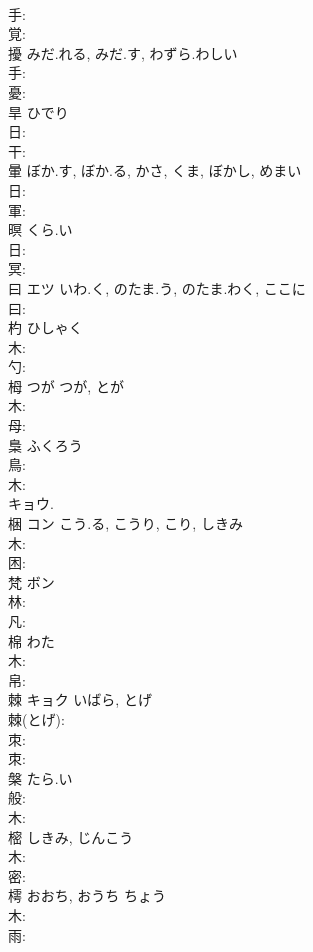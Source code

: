 \documentclass[8pt]{extreport}
\begin{document}
\begin{CJK}{UTF8}{min}
\\	手: 
\\	覚: 
\\	擾		みだ.れる, みだ.す, わずら.わしい				
\\	手: 
\\	憂: 
\\	旱		ひでり				
\\	日: 
\\	干: 
\\	暈		ぼか.す, ぼか.る, かさ, くま, ぼかし, めまい				
\\	日: 
\\	軍: 
\\	暝		くら.い				
\\	日: 
\\	冥: 
\\	曰	エツ	いわ.く, のたま.う, のたま.わく, ここに		
\\	曰: 
\\	杓		ひしゃく				
\\	木: 
\\	勺: 
\\	栂	つが	つが, とが		
\\	木: 
\\	母: 
\\	梟		ふくろう				
\\	鳥: 
\\	木: 
\\	キョウ.
\\	梱	コン	こう.る, こうり, こり, しきみ		
\\	木: 
\\	困: 
\\	梵	ボン			
\\	林: 
\\	凡: 
\\	棉		わた				
\\	木: 
\\	帛: 
\\	棘	キョク	いばら, とげ		
\\	棘(とげ): 
\\	朿: 
\\	朿: 
\\	槃		たら.い				
\\	般: 
\\	木: 
\\	樒		しきみ, じんこう				
\\	木: 
\\	密: 
\\	樗		おおち, おうち	ちょう			
\\	木: 
\\	雨: 

\end{CJK}
\end{document}
